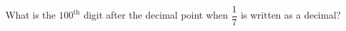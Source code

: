 What is the $100^{\text{th}}$ digit after the decimal point when $\dfrac{1}{7}$ is written as a decimal?
